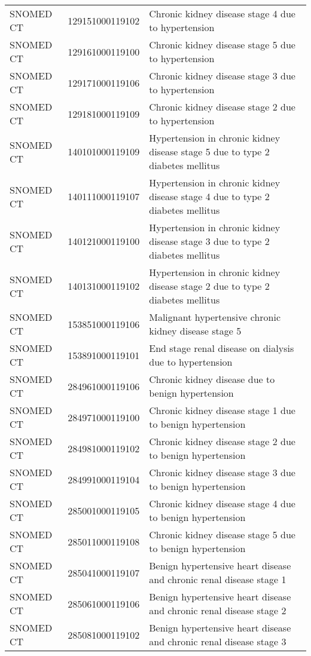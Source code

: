 \begin{table}[ht]
\begin{tabular}{lll}
  SNOMED CT & 129151000119102 & Chronic kidney disease stage 4 due to hypertension \\ 
  SNOMED CT & 129161000119100 & Chronic kidney disease stage 5 due to hypertension \\ 
  SNOMED CT & 129171000119106 & Chronic kidney disease stage 3 due to hypertension \\ 
  SNOMED CT & 129181000119109 & Chronic kidney disease stage 2 due to hypertension \\ 
  SNOMED CT & 140101000119109 & Hypertension in chronic kidney disease stage 5 due to type 2 diabetes mellitus \\ 
  SNOMED CT & 140111000119107 & Hypertension in chronic kidney disease stage 4 due to type 2 diabetes mellitus \\ 
  SNOMED CT & 140121000119100 & Hypertension in chronic kidney disease stage 3 due to type 2 diabetes mellitus \\ 
  SNOMED CT & 140131000119102 & Hypertension in chronic kidney disease stage 2 due to type 2 diabetes mellitus \\ 
  SNOMED CT & 153851000119106 & Malignant hypertensive chronic kidney disease stage 5 \\ 
  SNOMED CT & 153891000119101 & End stage renal disease on dialysis due to hypertension \\ 
  SNOMED CT & 284961000119106 & Chronic kidney disease due to benign hypertension \\ 
  SNOMED CT & 284971000119100 & Chronic kidney disease stage 1 due to benign hypertension \\ 
  SNOMED CT & 284981000119102 & Chronic kidney disease stage 2 due to benign hypertension \\ 
  SNOMED CT & 284991000119104 & Chronic kidney disease stage 3 due to benign hypertension \\ 
  SNOMED CT & 285001000119105 & Chronic kidney disease stage 4 due to benign hypertension \\ 
  SNOMED CT & 285011000119108 & Chronic kidney disease stage 5 due to benign hypertension \\ 
  SNOMED CT & 285041000119107 & Benign hypertensive heart disease and chronic renal disease stage 1 \\ 
  SNOMED CT & 285061000119106 & Benign hypertensive heart disease and chronic renal disease stage 2 \\ 
  SNOMED CT & 285081000119102 & Benign hypertensive heart disease and chronic renal disease stage 3 \\ 

\end{tabular}
\end{table}
